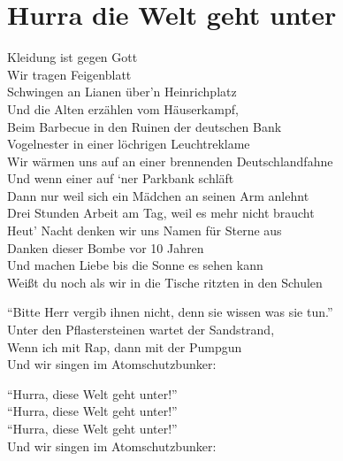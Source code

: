 \documentclass[]{book}
\begin{document}
\hypertarget{hurra-die-welt-geht-unter}{%
\section{Hurra die Welt geht unter}\label{hurra-die-welt-geht-unter}}

Kleidung ist gegen Gott\\
Wir tragen Feigenblatt\\
Schwingen an Lianen über'n Heinrichplatz\\
Und die Alten erzählen vom Häuserkampf,\\
Beim Barbecue in den Ruinen der deutschen Bank\\
Vogelnester in einer löchrigen Leuchtreklame\\
Wir wärmen uns auf an einer brennenden Deutschlandfahne\\
Und wenn einer auf `ner Parkbank schläft\\
Dann nur weil sich ein Mädchen an seinen Arm anlehnt\\
Drei Stunden Arbeit am Tag, weil es mehr nicht braucht\\
Heut' Nacht denken wir uns Namen für Sterne aus\\
Danken dieser Bombe vor 10 Jahren\\
Und machen Liebe bis die Sonne es sehen kann\\
Weißt du noch als wir in die Tische ritzten in den Schulen

``Bitte Herr vergib ihnen nicht, denn sie wissen was sie tun.''\\
Unter den Pflastersteinen wartet der Sandstrand,\\
Wenn ich mit Rap, dann mit der Pumpgun\\
Und wir singen im Atomschutzbunker:

``Hurra, diese Welt geht unter!''\\
``Hurra, diese Welt geht unter!''\\
``Hurra, diese Welt geht unter!''\\
Und wir singen im Atomschutzbunker:
\end{document}
